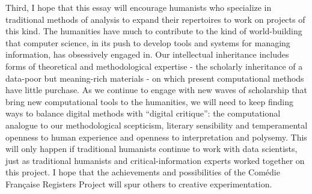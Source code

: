 \documentclass[	DIV=calc,%
							paper=a4,%
							fontsize=11pt,%
							twocolumn]{scrartcl}	 					%
\begin{document}
Third, I hope that this essay will encourage humanists who specialize in traditional methods of analysis to expand their repertoires to work on projects of this kind.  The humanities have much to contribute to the kind of world-building that computer science, in its push to develop tools and systems for managing information, has obsessively engaged in.  Our intellectual inheritance includes forms of theoretical and methodological expertise - the scholarly inheritance of a data-poor but meaning-rich materials - on which present computational methods have little purchase.  As we continue to engage with new waves of scholarship that bring new computational tools to the humanities, we will need to keep finding ways to balance digital methods with ``digital critique'': the computational analogue to our methodological scepticism, literary sensibility and temperamental openness to human experience and openness to interpretation and polysemy.  This will only happen if traditional humanists continue to work with data scientists, just as traditional humanists and critical-information experts worked together on this project.  I hope that the achievements and possibilities of the Comédie Française Registers Project will spur others to creative experimentation.


\printbibliography
\end{document}
